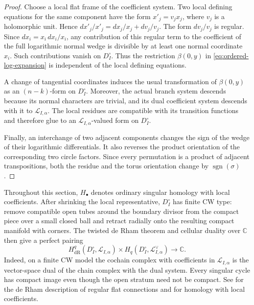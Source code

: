 \documentclass[12pt]{amsart}
\numberwithin{equation}{section}
\theoremstyle{plain}
\theoremstyle{definition}
\theoremstyle{remark}
\theoremstyle{definition}
\DeclareMathOperator{\sgn}{sgn}
\newcommand{\C}{\mathbb C}
\newcommand{\Lcal}{\mathscr L}
\begin{document}
\begin{proof}
Choose a local flat frame of the coefficient system. Two local defining equations for the same component have the form $x'_j=v_jx_j$, where $v_j$ is a holomorphic unit. Hence $dx'_j/x'_j=dx_j/x_j+dv_j/v_j$. The form $dv_j/v_j$ is regular. Since $dx_i=x_i\,dx_i/x_i$, any contribution of this regular term to the coefficient of the full logarithmic normal wedge is divisible by at least one normal coordinate $x_i$. Such contributions vanish on $D_I^\circ$. Thus the restriction $\beta(0,y)$ in \eqref{eq:ordered-log-expansion} is independent of the local defining equations.

A change of tangential coordinates induces the usual transformation of $\beta(0,y)$ as an $(n-k)$-form on $D_I^\circ$. Moreover, the actual branch system descends because its normal characters are trivial, and its dual coefficient system descends with it to $\Lcal_{I,\alpha}$. The local residues are compatible with its transition functions and therefore glue to an $\Lcal_{I,\alpha}$-valued form on $D_I^\circ$.

Finally, an interchange of two adjacent components changes the sign of the wedge of their logarithmic differentials. It also reverses the product orientation of the corresponding two circle factors. Since every permutation is a product of adjacent transpositions, both the residue and the torus orientation change by $\sgn(\sigma)$.
\end{proof}

Throughout this section, $H_\bullet$ denotes ordinary singular homology with local coefficients. After shrinking the local representative, $D_I^\circ$ has finite CW type: remove compatible open tubes around the boundary divisor from the compact piece over a small closed ball and retract radially onto the resulting compact manifold with corners. The twisted de Rham theorem and cellular duality over $\C$ then give a perfect pairing
\begin{equation}\label{eq:iterated-perfect-pairing}
 H^q_{\mathrm{dR}}(D_I^\circ,\Lcal_{I,\alpha})\times
 H_q(D_I^\circ,\Lcal_{I,\alpha}^\vee)\to \C.
\end{equation}
Indeed, on a finite CW model the cochain complex with coefficients in $\Lcal_{I,\alpha}$ is the vector-space dual of the chain complex with the dual system. Every singular cycle has compact image even though the open stratum need not be compact. See \cite{Deligne1970} for the de Rham description of regular flat connections and \cite[Chapter~VI]{Bredon1993} for homology with local coefficients.
\end{document}
